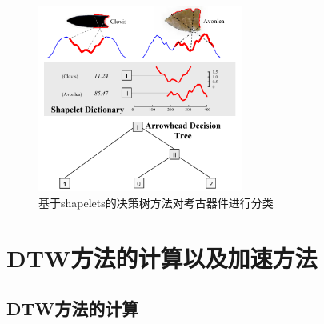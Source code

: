 \begin{figure}[h]
  \centering
  \includegraphics[width=0.6\textwidth]{./figure/anthropology.PNG}
  \caption{基于shapelets的决策树方法对考古器件进行分类}\label{fig:4}
\end{figure}

\chapter{DTW方法的计算以及加速方法}
\section{DTW方法的计算}
